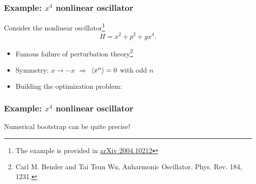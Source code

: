 \documentclass{beamer}
\begin{document}
\begin{frame}
\end{frame}

\begin{frame}
\frametitle{Example: $x^4$ nonlinear oscillator}

Consider the nonlinear oscillator\footnote{The example is provided in \href{https://arxiv.org/abs/2004.10212}{arXiv 2004.10212}}
\begin{equation}
    H = x^2 + p^2 + g x^4.
\end{equation}

\begin{itemize}
    \item Famous failure of perturbation theory\footnote{Carl M. Bender and Tai Tsun Wu, Anharmonic Oscillator. Phys. Rev. 184, 1231.}
    \item Symmetry: $x \to -x$ $\Rightarrow$ $\expval*{x^n} = 0$ with odd $n$
    \item Building the optimization problem: 
\end{itemize}

\end{frame}

\begin{frame}
\frametitle{Example: $x^4$ nonlinear oscillator}

Numerical bootstrap can be quite precise!    

\end{frame}
\end{document}
